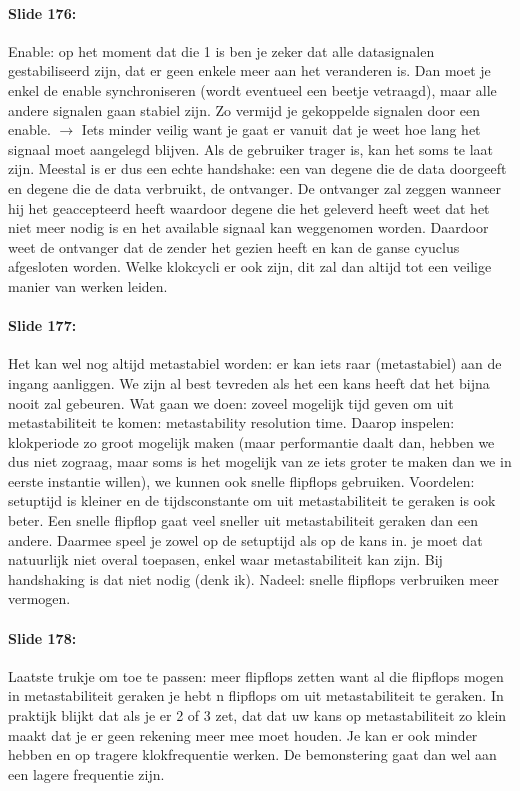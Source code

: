 \documentclass[10pt,a4paper]{book}
\begin{document}
\paragraph{Slide 176:} Enable: op het moment dat die 1 is ben je zeker dat alle datasignalen gestabiliseerd zijn, dat er geen enkele meer aan het veranderen is. Dan moet je enkel de enable synchroniseren (wordt eventueel een beetje vetraagd), maar alle andere signalen gaan stabiel zijn. Zo vermijd je gekoppelde signalen door een enable. $\rightarrow$ Iets minder veilig want je gaat er vanuit dat je weet hoe lang het signaal moet aangelegd blijven. Als de gebruiker trager is, kan het soms te laat zijn. Meestal is er dus een echte handshake: een van degene die de data doorgeeft en degene die de data verbruikt, de ontvanger. De ontvanger zal zeggen wanneer hij het geaccepteerd heeft waardoor degene die het geleverd heeft weet dat het niet meer nodig is en het available signaal kan weggenomen worden. Daardoor weet de ontvanger dat de zender het gezien heeft en kan de ganse cyuclus afgesloten worden. Welke klokcycli er ook zijn, dit zal dan altijd tot een veilige manier van werken leiden. 

\paragraph{Slide 177:} Het kan wel nog altijd metastabiel worden: er kan iets raar (metastabiel) aan de ingang aanliggen. We zijn al best tevreden als het een kans heeft dat het bijna nooit zal gebeuren. Wat gaan we doen: zoveel mogelijk tijd geven om uit metastabiliteit te komen: metastability resolution time. Daarop inspelen: klokperiode zo groot mogelijk maken (maar performantie daalt dan, hebben we dus niet zograag, maar soms is het mogelijk van ze iets groter te maken dan we in eerste instantie willen), we kunnen ook snelle flipflops gebruiken. Voordelen: setuptijd is kleiner en de tijdsconstante om uit metastabiliteit te geraken is ook beter. Een snelle flipflop gaat veel sneller uit metastabiliteit geraken dan een andere. Daarmee speel je zowel op de setuptijd als op de kans in. je moet dat natuurlijk niet overal toepasen, enkel waar metastabiliteit kan zijn. Bij handshaking is dat niet nodig (denk ik). Nadeel: snelle flipflops verbruiken meer vermogen.

\paragraph{Slide 178:} Laatste trukje om toe te passen: meer flipflops zetten want al die flipflops mogen in metastabiliteit geraken je hebt n flipflops om uit metastabiliteit te geraken. In praktijk blijkt dat als je er 2 of 3 zet, dat dat uw kans op metastabiliteit zo klein maakt dat je er geen rekening meer mee moet houden. Je kan er ook minder hebben en op tragere klokfrequentie werken. De bemonstering gaat dan wel aan een lagere frequentie zijn. 
\end{document}
